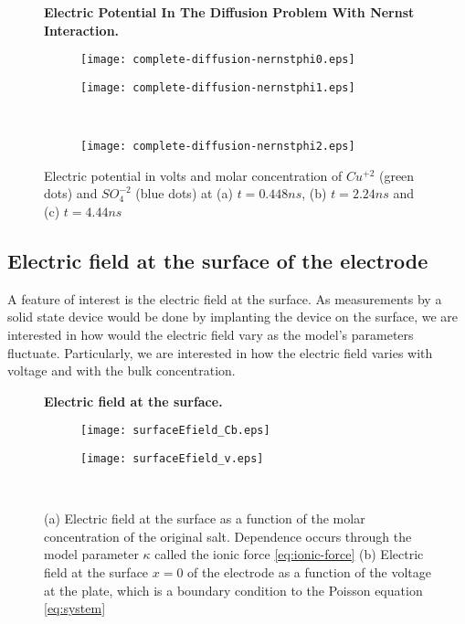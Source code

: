 \begin{figure}[htbp]
\centering
\textbf{Electric Potential In The Diffusion Problem With Nernst Interaction.}\par\medskip
\begin{subfigure}{.5\linewidth}
\centering
\texttt{[image: complete-diffusion-nernstphi0.eps]}
\caption{}
\label{fig:ef1}
\end{subfigure}%
\begin{subfigure}{.5\linewidth}
\centering
\texttt{[image: complete-diffusion-nernstphi1.eps]}
\caption{}
\label{fig:ef2}
\end{subfigure}\\[1ex]
\begin{subfigure}{\linewidth}
\centering
\texttt{[image: complete-diffusion-nernstphi2.eps]}
\caption{}
\label{fig:ef3}
\end{subfigure}
\caption{Electric potential in volts and molar concentration of $Cu^{+2}$ (green dots) and $SO_4^{-2}$ (blue dots) at (a) $t = 0.448 ns$, (b) $t = 2.24 ns$ and (c) $t = 4.44 ns$}
\label{fig:test}
\end{figure}


\newpage
\subsection{Electric field at the surface of the electrode}

A feature of interest is the electric field at the surface. As measurements by a solid state device would be done by implanting the device on the surface, we are interested in how would the electric field vary as the model's parameters fluctuate. Particularly, we are interested in how the electric field varies with voltage and with the bulk concentration.

\begin{figure}[htbp]
\centering
\textbf{Electric field at the surface.}\par\medskip
\begin{subfigure}{.5\linewidth}
\centering
\texttt{[image: surfaceEfield\_Cb.eps]}
\caption{}
\label{fig:ef1}
\end{subfigure}%
\begin{subfigure}{.5\linewidth}
\centering
\texttt{[image: surfaceEfield\_v.eps]}
\caption{}
\label{fig:ef2}
\end{subfigure}\\[1ex]
\caption{(a) Electric field at the surface as a function of the molar concentration of the original salt. Dependence occurs through the model parameter $\kappa$ called the ionic force \ref{eq:ionic-force} (b) Electric field at the surface $x=0$ of the electrode as a function of the voltage at the plate, which is a boundary condition to the Poisson equation \ref{eq:system}}
\label{fig:test}
\end{figure}




